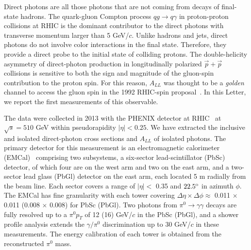 \documentclass[twocolumn,letterpaper,aps,prl,longbibliography,superscriptaddress,floatfix]{revtex4-2}
\newcommand{\pT}{\mbox{$p_T$}\xspace}
\newcommand{\pizero}{\mbox{$\pi^0$}\xspace}
\newcommand{\ALL}{\mbox{$A_{LL}$}\xspace}
\begin{document}
Direct photons are all those photons that are not coming from decays of 
final-state hadrons. The quark-gluon Compton process $qg \rightarrow 
q\gamma$ in proton-proton collisions at RHIC is the dominant contributor 
to the direct photons with transverse momentum larger than 5 GeV/$c$. 
Unlike hadrons and jets, direct photons do not involve color 
interactions in the final state. Therefore, they provide a direct probe 
to the initial state of colliding protons. The double-helicity asymmetry 
of direct-photon production in longitudinally polarized $\vec{p}+\vec{p}$ 
collisions is sensitive to both the sign and magnitude of the gluon-spin 
contribution to the proton spin. For this reason, \ALL was thought 
to be a \textit{golden} channel to access the gluon spin in the 1992 
RHIC-spin proposal~\cite{Bunce:1992vca,doi:10.1146/annurev.nucl.50.1.525}. 
In this Letter, we report the first measurements of this observable.


The data were collected in 2013 with the PHENIX 
detector at RHIC~\cite{ADCOX2003469} at $\sqrt{s}=510$ GeV within 
pseudorapidity $|\eta|<0.25$. We have extracted the inclusive and 
isolated direct-photon cross sections and \ALL of isolated photons. The 
primary detector for this measurement is an electromagnetic calorimeter 
(EMCal)~\cite{APHECETCHE2003521} comprising two subsystems, a 
six-sector lead-scintillator (PbSc) detector, of which four are on the 
west arm and two on the east arm, and a two-sector lead glass (PbGl) 
detector on the east arm, each located 5 m radially from the beam line. 
Each sector covers a range of $|\eta| <$ 0.35 and $22.5^{\rm o}$ in 
azimuth $\phi$. The EMCal has fine granularity with each tower covering 
$\Delta\eta \times \Delta\phi \approx$ 0.011 $\times$ 0.011 (0.008 
$\times$ 0.008) for PbSc (PbGl). Two photons from $\pi^0 \rightarrow 
\gamma\gamma$ decays are fully resolved up to a \pizero \pT of 12 (16) 
GeV/$c$ in the PbSc (PbGl), and a shower profile analysis extends the 
$\gamma/\pi^0$ discrimination up to 30 GeV/$c$ in these measurements. 
The energy calibration of each tower is obtained from the reconstructed 
\pizero mass.
\end{document}
